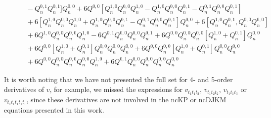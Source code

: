 \documentclass[11p,reqno]{amsart}
\numberwithin{equation}{section}
\numberwithin{equation}{section}
\begin{document}
\begin{align*}
    & \qquad - Q_n^{0, 1}Q_n^{0, 1}]Q_n^{0, 0} + 6Q^{0, 0}[Q_n^{1, 0}Q_n^{0, 0}Q_n^{1, 0} - Q_n^{1, 0}Q_n^{0, 0}Q_n^{0, 1} - Q_n^{0, 1}Q_n^{0, 0}Q_n^{0, 1}] \\ 
    & \qquad + 6[Q_n^{1, 0}Q_n^{0, 0}Q_n^{1, 0} + Q_n^{1, 0}Q_n^{0, 0}Q_n^{0, 1} - Q_n^{0, 1}Q_n^{0, 0}Q_n^{0, 1}]Q_n^{0, 0} + 6[Q_n^{1, 0}Q_n^{0, 1}, Q_n^{0, 0}Q_n^{0, 0}] \\ 
    & \qquad + 6Q^{1, 0}Q_n^{0, 0}Q_n^{0, 0}Q_n^{1, 0} - 6Q^{0, 1}Q_n^{0, 0}Q_n^{0, 0}Q_n^{0, 1} + 6Q^{0, 0}Q_n^{0, 0}Q_n^{0, 0}[Q_n^{1, 0} + Q_n^{0, 1}]Q_n^{0, 0} \\
    & \qquad + 6Q^{0, 0}[Q_n^{1, 0} + Q_n^{0, 1}]Q_n^{0, 0}Q_n^{0, 0}Q_n^{0, 0} + 6Q^{0, 0}Q_n^{0, 0}[Q_n^{1, 0} + Q_n^{0, 1}]Q_n^{0, 0}Q_n^{0, 0} \\ 
    & \qquad + 6Q^{0, 0}Q_n^{0, 0}Q_n^{0, 0}Q_n^{0, 0}Q_n^{1, 0} + 6Q^{0, 1}Q_n^{0, 0}Q_n^{0, 0}Q_n^{0, 0}Q_n^{0, 0}    
\end{align*}

It is worth noting that we have not presented the full set for 4- and 5-order derivatives of $v$, for example, we missed the expressions for $v_{t_1t_1t_2}$, $v_{t_1t_2t_2}$, $v_{t_1t_1t_3}$ or $v_{t_1t_1t_1t_1t_1}$, since these derivatives are not involved in the ncKP or ncDJKM equations presented in this work.
\end{document}
